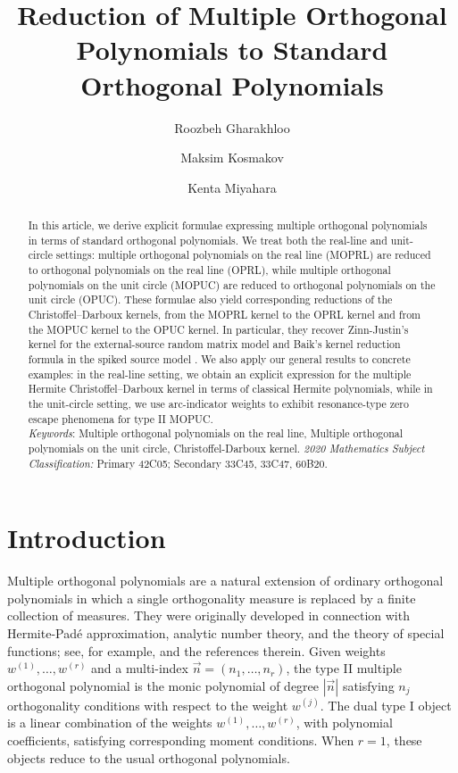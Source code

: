 \documentclass[a4paper,10pt,leqno]{amsart}
\title{Reduction of Multiple Orthogonal Polynomials to Standard Orthogonal Polynomials}
\author[Gharakhloo]{Roozbeh Gharakhloo}
\author[Kosmakov]{Maksim Kosmakov}
\author[Miyahara]{Kenta Miyahara}
\numberwithin{equation}{section}
\theoremstyle{remark}
\begin{document}
\begin{abstract}
In this article, we derive explicit formulae expressing multiple orthogonal polynomials in terms of standard orthogonal polynomials. We treat both the real-line and unit-circle settings: multiple orthogonal polynomials on the real line (MOPRL) are reduced to orthogonal polynomials on the real line (OPRL), while multiple orthogonal polynomials on the unit circle (MOPUC) are reduced to orthogonal polynomials on the unit circle (OPUC). These formulae also yield corresponding reductions of the Christoffel--Darboux kernels, from the MOPRL kernel to the OPRL kernel and from the MOPUC kernel to the OPUC kernel. In particular, they recover Zinn-Justin's kernel for the external-source random matrix model \cite{ZinnJustin1997} and Baik's kernel reduction formula in the spiked source model \cite{Bai09}. We also apply our general results to concrete examples: in the real-line setting, we obtain an explicit expression for the multiple Hermite Christoffel--Darboux kernel in terms of classical Hermite polynomials, while in the unit-circle setting, we use arc-indicator weights to exhibit
resonance-type zero escape phenomena for type II MOPUC.
\\
\newline
\textit{Keywords}: Multiple orthogonal polynomials on the real line, Multiple orthogonal polynomials on the unit circle, Christoffel-Darboux kernel.
\vspace{.05cm}
\newline
\textit{2020 Mathematics Subject Classification:} Primary 42C05; Secondary 33C45, 33C47, 60B20.
\end{abstract}

\maketitle

\setlength{\parskip}{6pt}


 


\section{Introduction}

Multiple orthogonal polynomials are a natural extension of ordinary orthogonal
polynomials in which a single orthogonality measure is replaced by a finite
collection of measures.  They were originally developed in connection with
Hermite-Padé approximation, analytic number theory, and the theory of special
functions; see, for example, \cite{Apt98,Kui10,VA20} and the references therein.
Given weights \(w^{(1)},\ldots,w^{(r)}\) and a multi-index
\(\vec n=(n_1,\ldots,n_r)\), the type II multiple orthogonal polynomial is the
monic polynomial of degree \(|\vec n|\) satisfying \(n_j\) orthogonality
conditions with respect to the weight \(w^{(j)}\).  The dual type I object is a
 linear combination of the weights \(w^{(1)},\ldots,w^{(r)}\), with
polynomial coefficients, satisfying corresponding moment conditions.  When
\(r=1\), these objects reduce to the usual orthogonal polynomials.
\end{document}
